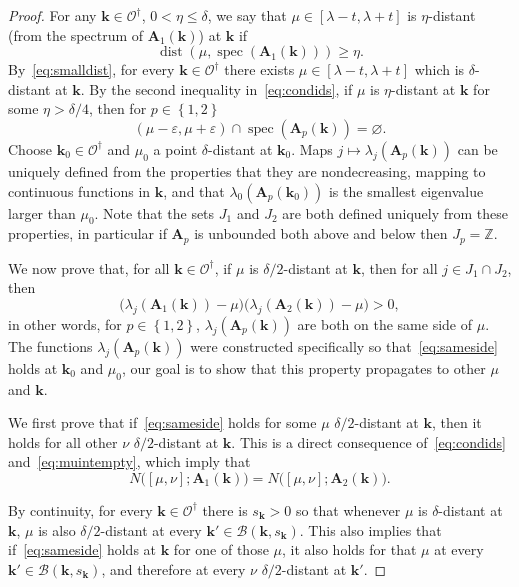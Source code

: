 \documentclass[10pt]{amsart}
\theoremstyle{definition}\newtheorem{defi}[theo]{Definition}\newtheorem{rema}[theo]{Remark}\newtheorem{exam}[theo]{Example}\newtheorem{nota}[theo]{Notation}
\DeclareMathOperator{\spec}{spec}
\DeclareMathOperator{\dist}{dist}
\newcommand{\Z}{\mathbb Z}
\newcommand{\CB}{\mathcal{B}}
\newcommand{\CO}{\mathcal{O}}
\newcommand{\BA}{\mathbf A}
\newcommand{\bk}{\mathbf k}
\newcommand{\eps}{\varepsilon}
\newcommand{\set}[1]{\left\{ #1 \right\}}
\begin{document}
\begin{proof}
For any $\bk \in \CO^\dagger$, $0 < \eta \le \delta$, we say that $\mu \in [\lambda - t,
\lambda + t]$ is $\eta$-distant (from the spectrum of $\BA_1(\bk)$) at $\bk$ if
\begin{equation}\label{eq:choicemu}
\dist(\mu,\spec(\BA_1(\bk))) \ge \eta.
\end{equation}
By~\eqref{eq:smalldist}, for every $\bk \in \CO^\dagger$ there exists $\mu \in [\lambda - t, \lambda + t]$ which is $\delta$-distant at $\bk$. By the second inequality in~\eqref{eq:condids}, if $\mu$ is $\eta$-distant at $\bk$ for some $\eta > \delta/4$, then for $p \in \set{1,2}$
\begin{equation}\label{eq:muintempty}
(\mu - \eps,\mu + \eps) \cap \spec(\BA_p(\bk)) = \varnothing.
\end{equation}
Choose $\bk_0 \in \CO^\dagger$ and $\mu_0$ a point $\delta$-distant at $\bk_0$. Maps $j \mapsto \lambda_j(\BA_p(\bk))$ can be uniquely defined from the properties that they are nondecreasing, mapping to continuous functions in $\bk$, and that $\lambda_0(\BA_p(\bk_0))$ is the smallest eigenvalue larger than $\mu_0$. Note that the sets $J_1$ and $J_2$ are both defined uniquely from these properties, in particular if $\BA_p$ is unbounded both above and below then $J_p = \Z$.

We now prove that, for all $\bk \in \CO^\dagger$, if $\mu$ is $\delta/2$-distant at $\bk$, then for all $j \in J_1 \cap J_2$, then
\begin{equation}\label{eq:sameside}
\big(\lambda_j(\BA_1(\bk)) - \mu\big) \big(\lambda_j(\BA_2(\bk)) - \mu\big) > 0,
\end{equation}
in other words, for $p \in \set{1,2}$, $\lambda_j(\BA_p(\bk))$ are both on the same side of $\mu$. The functions $\lambda_j(\BA_p(\bk))$ were constructed specifically so that~\eqref{eq:sameside} holds at $\bk_0$ and $\mu_0$, our goal is to show that this property propagates to other $\mu$ and $\bk$.

We first prove that if~\eqref{eq:sameside} holds for some $\mu$ $\delta/2$-distant at $\bk$, then it holds for all other $\nu$ $\delta/2$-distant at $\bk$. This is a direct consequence of~\eqref{eq:condids} and~\eqref{eq:muintempty}, which imply that
\begin{equation}
N\big([\mu,\nu];\BA_1(\bk)\big) = N\big([\mu,\nu];\BA_2(\bk)\big).
\end{equation}

By continuity, for every $\bk \in \CO^\dagger$ there is $s_\bk > 0$ so that whenever $\mu$ is $\delta$-distant at $\bk$, $\mu$ is also $\delta/2$-distant at every $\bk' \in \CB(\bk,s_\bk)$. This also implies that if~\eqref{eq:sameside} holds at $\bk$ for one of those $\mu$, it also holds for that $\mu$ at every $\bk' \in \CB(\bk,s_\bk)$, and therefore at every $\nu$ $\delta/2$-distant at $\bk'$.


\end{proof}
\end{document}
